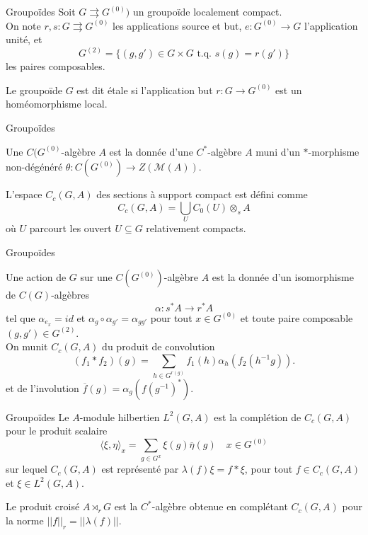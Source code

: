 \begin{frame}{Groupoïdes}
Soit $G \rightrightarrows G^{(0)}) $ un groupoïde localement compact.\\
\vspace{0.3 cm}
On note $r,s:G \rightrightarrows G^{(0)}$ les applications source et but, $e : G^{(0)} \rightarrow G$ l'application unité, et 
\[G^{(2)} = \{(g,g') \in G\times G \text{ t.q. } s(g)=r(g')\}\]
les paires composables.\\
\vspace{0.3 cm}
\begin{definitionfr}
Le groupoïde $G$ est dit étale si l'application but $r : G \rightarrow G^{(0)} $ est un homéomorphisme local.
\end{definitionfr}

\end{frame}

\begin{frame}{Groupoïdes}

Une $C(G^{(0)}$-algèbre $A$ est la donnée d'une $C^*$-algèbre $A$ muni d'un $*$-morphisme non-dégénéré $\theta : C(G^{(0)}) \rightarrow Z(\mathcal M(A))$.\\ 

\begin{definitionfr}
L'espace $C_c(G,A)$ des sections à support compact est défini comme
\[C_c(G,A) = \bigcup_U C_0(U)\otimes_s A\]
où $U$ parcourt les ouvert $U\subseteq G$ relativement compacts.
\end{definitionfr}

\end{frame}

\begin{frame}{Groupoïdes}

Une action de $G$ sur une $C(G^{(0)})$-algèbre $A$ est la donnée d'un isomorphisme de $C(G)$-algèbres 
\[\alpha : s^* A \rightarrow r^* A\]
tel que $\alpha_{e_x} = id$ et $\alpha_g \circ \alpha_{g'}  = \alpha_{gg'}$ pour tout $x\in G^{(0)}$ et toute paire composable $(g,g') \in G^{(2)}$.\\ 
\vspace{0.3 cm}
On munit $C_c(G,A)$ du produit de convolution 
\[(f_1\ast f_2)(g) = \sum_{h\in G^{r(g)}} f_1(h) \alpha_h(f_2(h^{-1}g)).\]
et de l'involution $\overline f(g)=\alpha_g(f(g^{-1})^*)$.\\

\end{frame}

\begin{frame}{Groupoïdes}
Le $A$-module hilbertien $L^2(G,A)$ est la complétion de $C_c(G,A)$ pour le produit scalaire 
\[\langle \xi ,\eta \rangle_x  = \sum_{g\in G^x} \xi(g)\overline \eta(g) \quad x\in G^{(0)} \]
sur lequel $C_c(G,A)$ est représenté par $\lambda(f) \xi = f\ast \xi$, pour tout $ f\in C_c(G,A)$ et $\xi\in L^2(G,A)$.\\
\vspace{0.3 cm}
\begin{definitionfr}
Le produit croisé $A\rtimes_r G$ est la $C^*$-algèbre obtenue en complétant $C_c(G,A)$ pour la norme $||f||_r=||\lambda(f)||$.
\end{definitionfr}

\end{frame}

